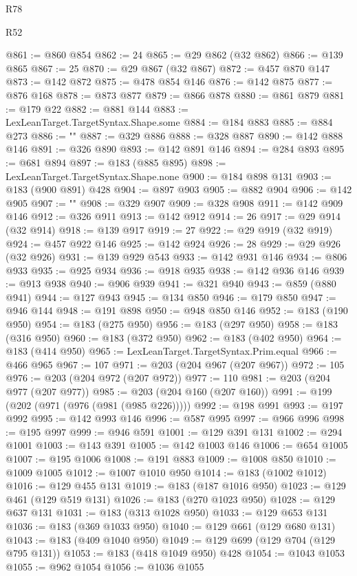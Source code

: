 \begin{lexlean}{R78}
\begin{lexlean}{R52}
\begin{coremodule}
{{{{{{{{{{{{{{{{{{{{{{{{{{{{{{{{{{{{{{{{{{{{{{{{{{{{{{{{{{{{{{{{{{{{{{{{{{{{{{{{{{{{{{{{{{{{{{{{{{{{{{{{{{{{{{{{{{{{{{{{{{{{{{{{{{{{{{{{{{{{{{{{{{{{{{{{{{{{{{{{{{{{{{{{{{{{{{{{{{{{{{{{{{{{{{{{{{{{{{@861 := @860 @854
@862 := 24
@865 := @29 @862 (@32 @862)
@866 := @139 @865
@867 := 25
@870 := @29 @867 (@32 @867)
@872 := @457 @870 @147
@873 := @142 @872
@875 := @478 @854 @146
@876 := @142 @875
@877 := @876 @168
@878 := @873 @877
@879 := @866 @878
@880 := @861 @879
@881 := @179 @22
@882 := @881 @144
@883 := LexLeanTarget.TargetSyntax.Shape.some
@884 := @184 @883
@885 := @884 @273
@886 := "{"
@887 := @329 @886
@888 := @328 @887
@890 := @142 @888 @146
@891 := @326 @890
@893 := @142 @891 @146
@894 := @284 @893
@895 := @681 @894
@897 := @183 (@885 @895)
@898 := LexLeanTarget.TargetSyntax.Shape.none
@900 := @184 @898 @131
@903 := @183 (@900 @891) @428
@904 := @897 @903
@905 := @882 @904
@906 := @142 @905
@907 := "}"
@908 := @329 @907
@909 := @328 @908
@911 := @142 @909 @146
@912 := @326 @911
@913 := @142 @912
@914 := 26
@917 := @29 @914 (@32 @914)
@918 := @139 @917
@919 := 27
@922 := @29 @919 (@32 @919)
@924 := @457 @922 @146
@925 := @142 @924
@926 := 28
@929 := @29 @926 (@32 @926)
@931 := @139 @929 @543
@933 := @142 @931 @146
@934 := @806 @933
@935 := @925 @934
@936 := @918 @935
@938 := @142 @936 @146
@939 := @913 @938
@940 := @906 @939
@941 := @321 @940
@943 := @859 (@880 @941)
@944 := @127 @943
@945 := @134 @850
@946 := @179 @850
@947 := @946 @144
@948 := @191 @898
@950 := @948 @850 @146
@952 := @183 (@190 @950)
@954 := @183 (@275 @950)
@956 := @183 (@297 @950)
@958 := @183 (@316 @950)
@960 := @183 (@372 @950)
@962 := @183 (@402 @950)
@964 := @183 (@414 @950)
@965 := LexLeanTarget.TargetSyntax.Prim.equal
@966 := @466 @965
@967 := 107
@971 := @203 (@204 @967 (@207 @967))
@972 := 105
@976 := @203 (@204 @972 (@207 @972))
@977 := 110
@981 := @203 (@204 @977 (@207 @977))
@985 := @203 (@204 @160 (@207 @160))
@991 := @199 (@202 (@971 (@976 (@981 (@985 @226)))))
@992 := @198 @991
@993 := @197 @992
@995 := @142 @993 @146
@996 := @587 @995
@997 := @966 @996
@998 := @195 @997
@999 := @946 @591
@1001 := @129 @391 @131
@1002 := @294 @1001
@1003 := @143 @391
@1005 := @142 @1003 @146
@1006 := @654 @1005
@1007 := @195 @1006
@1008 := @191 @883
@1009 := @1008 @850
@1010 := @1009 @1005
@1012 := @1007 @1010 @950
@1014 := @183 (@1002 @1012)
@1016 := @129 @455 @131
@1019 := @183 (@187 @1016 @950)
@1023 := @129 @461 (@129 @519 @131)
@1026 := @183 (@270 @1023 @950)
@1028 := @129 @637 @131
@1031 := @183 (@313 @1028 @950)
@1033 := @129 @653 @131
@1036 := @183 (@369 @1033 @950)
@1040 := @129 @661 (@129 @680 @131)
@1043 := @183 (@409 @1040 @950)
@1049 := @129 @699 (@129 @704 (@129 @795 @131))
@1053 := @183 (@418 @1049 @950) @428
@1054 := @1043 @1053
@1055 := @962 @1054
@1056 := @1036 @1055
}}}}}}}}}}}}}}}}}}}}}}}}}}}}}}}}}}}}}}}}}}}}}}}}}}}}}}}}}}}}}}}}}}}}}}}}}}}}}}}}}}}}}}}}}}}}}}}}}}}}}}}}}}}}}}}}}}}}}}}}}}}}}}}}}}}}}}}}}}}}}}}}}}}}}}}}}}}}}}}}}}}}}}}}}}}}}}}}}}}}}}}}}}}}}}}}}}}}}}
\end{coremodule}
\end{lexlean}
\end{lexlean}
